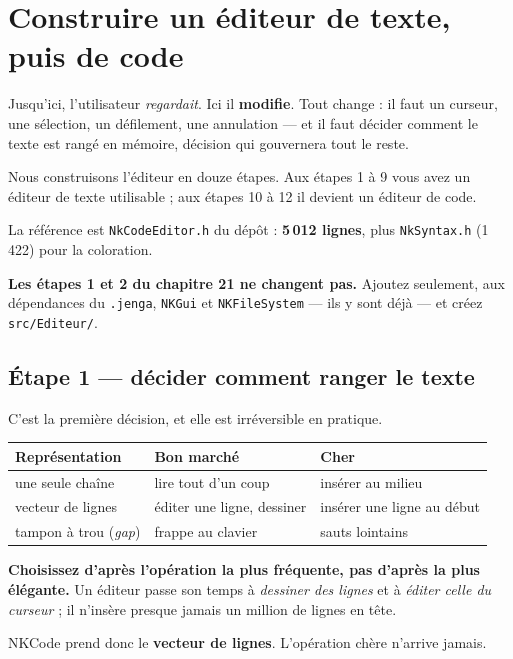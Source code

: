 \chapter{Construire un éditeur de texte, puis de code}

Jusqu'ici, l'utilisateur \emph{regardait}. Ici il \textbf{modifie}. Tout change :
il faut un curseur, une sélection, un défilement, une annulation --- et il faut
décider comment le texte est rangé en mémoire, décision qui gouvernera tout le
reste.

Nous construisons l'éditeur en douze étapes. Aux étapes 1 à 9 vous avez un
éditeur de texte utilisable ; aux étapes 10 à 12 il devient un éditeur de code.

La référence est \texttt{NkCodeEditor.h} du dépôt : \textbf{5\,012 lignes}, plus
\texttt{NkSyntax.h} (1\,422) pour la coloration.

\begin{nkretenir}
\textbf{Les étapes 1 et 2 du chapitre 21 ne changent pas.} Ajoutez seulement, aux
dépendances du \texttt{.jenga}, \texttt{NKGui} et \texttt{NKFileSystem} --- ils y
sont déjà --- et créez \texttt{src/Editeur/}.
\end{nkretenir}

\section{Étape 1 --- décider comment ranger le texte}

C'est la première décision, et elle est irréversible en pratique.

\begin{center}
\begin{tabular}{@{}lll@{}}
\toprule
\textbf{Représentation} & \textbf{Bon marché} & \textbf{Cher} \\
\midrule
une seule chaîne & lire tout d'un coup & insérer au milieu \\
vecteur de lignes & éditer une ligne, dessiner & insérer une ligne au début \\
tampon à trou (\emph{gap}) & frappe au clavier & sauts lointains \\
\bottomrule
\end{tabular}
\end{center}

\begin{nkretenir}
\textbf{Choisissez d'après l'opération la plus fréquente, pas d'après la plus
élégante.} Un éditeur passe son temps à \emph{dessiner des lignes} et à
\emph{éditer celle du curseur} ; il n'insère presque jamais un million de lignes
en tête.

NKCode prend donc le \textbf{vecteur de lignes}. L'opération chère n'arrive
jamais.
\end{nkretenir}

